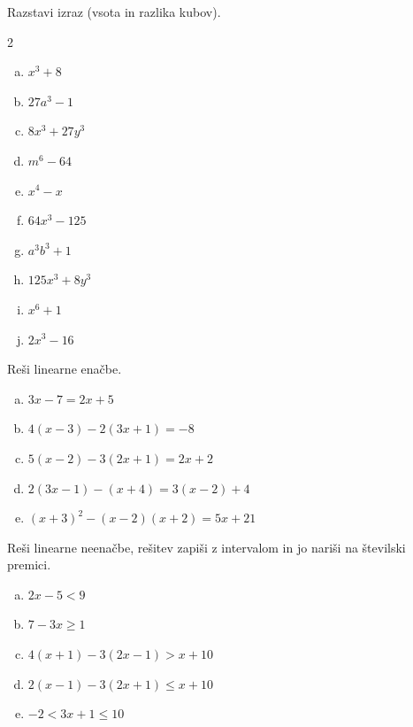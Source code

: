 \documentclass[a4paper,12pt]{letter}
\newcounter{tocke}
\begin{document}
\begin{naloga}[\hfill $\tockeH$] \addtocounter{tocke}{\numexpr\tockeH\relax}
Razstavi izraz (vsota in razlika kubov).
\begin{multicols}{2}
\begin{enumerate}[a)]
\item $\displaystyle x^3+8$
\item $\displaystyle 27a^3-1$
\item $\displaystyle 8x^3+27y^3$
\item $\displaystyle m^6-64$
\item $\displaystyle x^4-x$
\end{enumerate}
\columnbreak
\begin{enumerate}[a)]\setcounter{enumi}{5}
\item $\displaystyle 64x^3-125$
\item $\displaystyle a^3b^3+1$
\item $\displaystyle 125x^3+8y^3$
\item $\displaystyle x^6+1$
\item $\displaystyle 2x^3-16$
\end{enumerate}
\end{multicols}
\end{naloga}

\begin{naloga}[\hfill $\tockeI$] \addtocounter{tocke}{\numexpr\tockeI\relax}
Re\v{s}i linearne ena\v{c}be.
\begin{enumerate}[a)]
\item $\displaystyle 3x-7=2x+5$
\item $\displaystyle 4(x-3)-2(3x+1)=-8$
\item $\displaystyle 5(x-2)-3(2x+1)=2x+2$
\item $\displaystyle 2(3x-1)-(x+4)=3(x-2)+4$
\item $\displaystyle (x+3)^2-(x-2)(x+2)=5x+21$
\end{enumerate}
\end{naloga}

\begin{naloga}[\hfill $\tockeJ$] \addtocounter{tocke}{\numexpr\tockeJ\relax}
Re\v{s}i linearne neena\v{c}be, re\v{s}itev zapi\v{s}i z intervalom in jo nari\v{s}i na \v{s}tevilski premici.
\begin{enumerate}[a)]
\item $\displaystyle 2x-5<9$
\item $\displaystyle 7-3x\ge1$
\item $\displaystyle 4(x+1)-3(2x-1)>x+10$
\item $\displaystyle 2(x-1)-3(2x+1)\le x+10$
\item $\displaystyle -2<3x+1\le10$
\end{enumerate}
\end{naloga}
\end{document}
